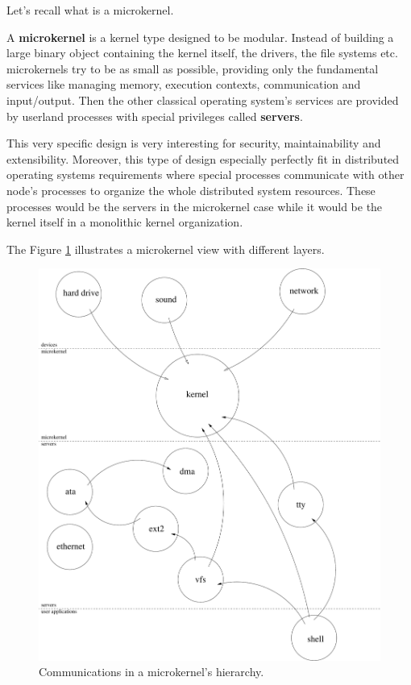 Let's recall what is a microkernel.

A \textbf{microkernel} is a kernel type designed to be modular. Instead
of building a large binary object containing the kernel itself, the drivers,
the file systems etc. microkernels try to be as small as possible,
providing only the fundamental services like managing memory, execution
contexts, communication and input/output. Then the other classical operating
system's services are provided by userland processes with special privileges
called \textbf{servers}.

This very specific design is very interesting for security, maintainability
and extensibility. Moreover, this type of design especially perfectly fit
in distributed operating systems requirements where special processes
communicate with other node's processes to organize the whole distributed
system resources. These processes would be the servers in the microkernel
case while it would be the kernel itself in a monolithic kernel organization.

The Figure \ref{figure:overview_microkernel} illustrates a microkernel
view with different layers.

\begin{figure}[h]
  \begin{center}
    \includegraphics[scale=0.5]{figures/overview_microkernel.pdf}
    \caption{Communications in a microkernel's hierarchy.}
    \label{figure:overview_microkernel}
  \end{center}
\end{figure}

